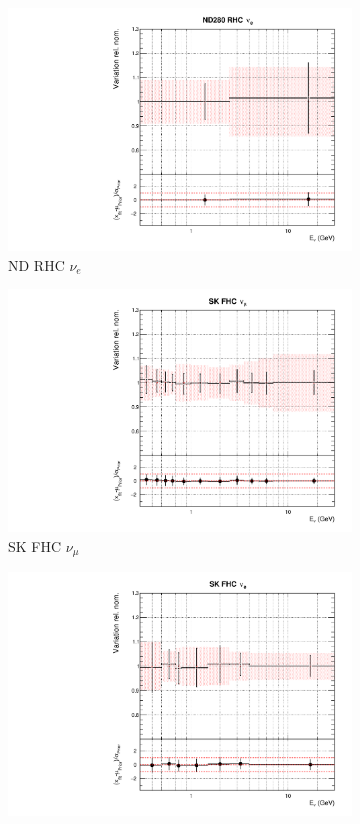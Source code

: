 \begin{figure}
\begin{subfigure}{0.24\textwidth}
  \includegraphics[width=0.95\linewidth]{figs/asmvflux7}
  \caption{ND RHC $\nu_e$}
  \label{fig:}
\end{subfigure}
\begin{subfigure}{0.24\textwidth}
  \centering
  \includegraphics[width=0.95\linewidth]{figs/asmvflux8}
  \caption{SK FHC $\nu_{\mu}$}
  \label{fig:}
\end{subfigure}
\begin{subfigure}{0.24\textwidth}
  \centering
  \includegraphics[width=0.95\linewidth]{figs/asmvflux9}

\end{subfigure}
\end{figure}
